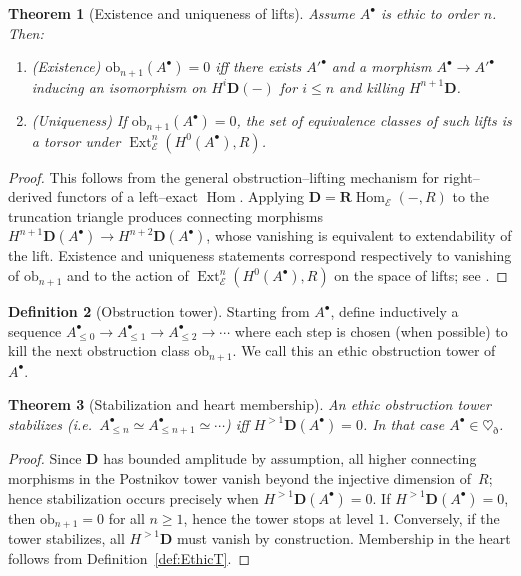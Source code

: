 \documentclass[12pt]{article}
\newcommand{\ob}{\mathrm{ob}}
\newcommand{\E}{\mathcal{E}}
\newcommand{\Hom}{\operatorname{Hom}}
\newcommand{\Ext}{\operatorname{Ext}}
\newcommand{\RHom}{\mathbf{R}\!\operatorname{Hom}}
\theoremstyle{plain}
\newtheorem{theorem}{Theorem}[section]
\theoremstyle{definition}
\newtheorem{definition}[theorem]{Definition}
\theoremstyle{remark}
\numberwithin{equation}{section}
\begin{document}
\begin{theorem}[Existence and uniqueness of lifts]\label{thm:lift}
Assume \(A^\bullet\) is ethic to order \(n\). Then:
\begin{enumerate}[label=(\alph*)]
\item {(Existence)} \(\ob_{n+1}(A^\bullet)=0\) iff there exists \(A'^\bullet\) and a morphism \(A^\bullet\to A'^\bullet\) inducing an isomorphism on \(H^i\mathbf D(-)\) for \(i\le n\) and killing \(H^{n+1}\mathbf D\).
\item {(Uniqueness)} If \(\ob_{n+1}(A^\bullet)=0\), the set of equivalence classes of such lifts is a torsor under \(\Ext^{n}_\E(H^0(A^\bullet),R)\).
\end{enumerate}
\end{theorem}

\begin{proof}
This follows from the general obstruction–lifting mechanism
for right–derived functors of a left–exact $\Hom$.
Applying $\mathbf D=\RHom_\E(-,R)$ to the truncation triangle
produces connecting morphisms
$H^{n+1}\mathbf D(A^\bullet)\!\to\!H^{n+2}\mathbf D(A^\bullet)$,
whose vanishing is equivalent to extendability of the lift.
Existence and uniqueness statements correspond respectively
to vanishing of $\ob_{n+1}$ and to the action of
$\Ext^n_\E(H^0(A^\bullet),R)$ on the space of lifts;
see \cite{GelfandManin2003}.
\end{proof}

\begin{definition}[Obstruction tower]\label{def:ob-tower}
Starting from \(A^\bullet\), define inductively a sequence \(A_{\le 0}^\bullet\to A_{\le1}^\bullet\to A_{\le2}^\bullet\to\cdots\) where each step is chosen (when possible) to kill the next obstruction class \(\ob_{n+1}\). We call this an ethic obstruction tower of \(A^\bullet\).
\end{definition}

\begin{theorem}[Stabilization and heart membership]\label{thm:stabilize}
An ethic obstruction tower stabilizes (i.e.\ \(A_{\le n}^\bullet\simeq A_{\le n+1}^\bullet\simeq\cdots\)) iff \(H^{>1}\mathbf D(A^\bullet)=0\). In that case \(A^\bullet\in \heartsuit_{\eth}\).
\end{theorem}

\begin{proof}
Since $\mathbf D$ has bounded amplitude by assumption,
all higher connecting morphisms in the Postnikov tower vanish
beyond the injective dimension of~$R$;
hence stabilization occurs precisely when $H^{>1}\mathbf D(A^\bullet)=0$. If \(H^{>1}\mathbf D(A^\bullet)=0\), then \(\ob_{n+1}=0\) for all \(n\ge1\), hence the tower stops at level \(1\). Conversely, if the tower stabilizes, all \(H^{>1}\mathbf D\) must vanish by construction. Membership in the heart follows from Definition~\ref{def:EthicT}.
\end{proof}
\end{document}
